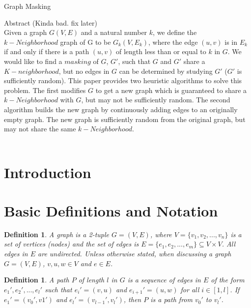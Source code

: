 \documentclass[11pt]{article}
\newtheorem{definition}[thm]{Definition}
\begin{document}
\begin{center}
Graph Masking
\end{center}
\vspace{.1in}

Abstract (Kinda bad. fix later)\\
\noindent Given a graph $G(V,E)$ and a natural number $k$, we define the $k-Neighborhood$  graph of G to be $G_k(V, E_k)$, where the edge $(u,v)$ is in $E_k$ if and only if there is a path $(u,v)$ of length less than or equal to $k$ in $G$. We would like to find a $masking$ of $G$, $G'$, such that $G$ and $G'$ share a $K-neighborhood$, but no edges in $G$ can be determined by studying $G'$ ($G'$ is sufficiently random). This paper provides two heuristic algorithms to solve this problem. The first modifies $G$ to get a new graph which is guaranteed to share a $k-Neighborhood$ with $G$, but may not be sufficiently random. The second algorithm builds the new graph by continuously adding edges to an originally empty graph. The new graph is sufficiently random from the original graph, but may not share the same $k-Neighborhood$.
\\\\


\section{Introduction}

\section{Basic Definitions and Notation}

\begin{definition}
A \emph{graph} is a 2-tuple $G = (V,E)$, where $V = \{v_1,v_2,...,v_n\}$ is a set of vertices (nodes) and the set of edges is $E = \{e_1,e_2,...,e_m\} \subseteq V \times V$. All edges in $E$ are undirected. Unless otherwise stated, when discussing a graph $G=(V,E)$, $v,u,w \in V$ and $e \in E$. 
\end{definition}

\begin{definition}
 A \emph{path} $P$ of length $l$ in $G$ is a sequence of edges in $E$ of the form $e_1', e_2', ...,e_l'$ such that $e_i' = (v,u)$ and $e_{i+1}' = (u,w)$ for all $i \in [1,l]$. If $e_1' = (v_0', v1')$ and $e_l' = (v_{l-1}', v_l')$, then $P$ is a path from $v_0'$ to $v_l'$. 
\end{definition}
\end{document}
